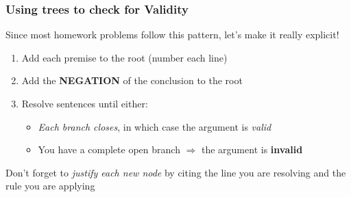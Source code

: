 \begin{frame}
\frametitle{Using trees to check for Validity}

Since most homework problems follow this pattern, let's make it really explicit!

\begin{enumerate}[<+->]

\item Add each premise to the root (number each line)

\item Add the \textbf{NEGATION} of the conclusion to the root

\item Resolve sentences until either:

\medskip

\begin{itemize}

\item \emph{Each branch closes}, in which case the argument is \emph{valid}

\item You have \textcolor{OGlyallpink}{a complete open branch} $\Rightarrow$ the argument is \textcolor{OGlyallpink}{\textbf{invalid}}

\end{itemize}

\end{enumerate}

Don't forget to \emph{justify each new node} by citing the line you are resolving and the rule you are applying


\end{frame}

